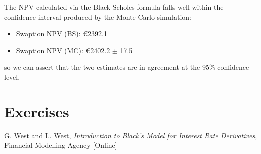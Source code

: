 The NPV calculated via the Black-Scholes formula falls well within the confidence interval produced by the Monte Carlo simulation:

\begin{itemize}
\tightlist
\item
  Swaption NPV (BS): \euro{2392.1}
\item
  Swaption NPV (MC): \euro{2402.2} $\pm$ 17.5
\end{itemize}
so we can assert that the two estimates are in agreement at the 95\% confidence level.

\section{Exercises}


\begin{thebibliography}{9}
 G. West and L. West, \href{http://janroman.dhis.org/finance/Black/IntroToBlack.pdf}{\emph{Introduction to Black's Model for Interest Rate Derivatives}}, Financial Modelling Agency [Online]
\end{thebibliography}